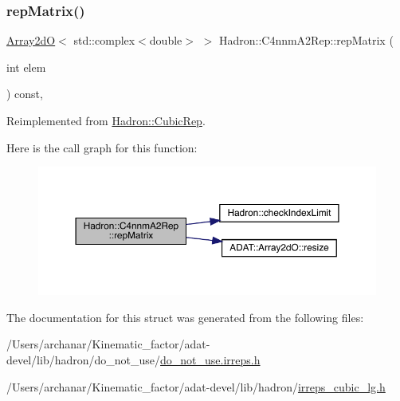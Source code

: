 \subsubsection{\texorpdfstring{repMatrix()}{repMatrix()}\hspace{0.1cm}{\footnotesize\ttfamily [3/3]}}
{\footnotesize\ttfamily \mbox{\hyperlink{classADAT_1_1Array2dO}{Array2dO}}$<$ std\+::complex$<$double$>$ $>$ Hadron\+::\+C4nnm\+A2\+Rep\+::rep\+Matrix (\begin{DoxyParamCaption}\item[{int}]{elem }\end{DoxyParamCaption}) const\hspace{0.3cm}{\ttfamily [inline]}, {\ttfamily [virtual]}}



Reimplemented from \mbox{\hyperlink{structHadron_1_1CubicRep_ac5d7e9e6f4ab1158b5fce3e4ad9e8005}{Hadron\+::\+Cubic\+Rep}}.

Here is the call graph for this function\+:
\nopagebreak
\begin{figure}[H]
\begin{center}
\leavevmode
\includegraphics[width=350pt]{d6/d9a/structHadron_1_1C4nnmA2Rep_a7c58333a62449bb9badf449950b1828b_cgraph}
\end{center}
\end{figure}


The documentation for this struct was generated from the following files\+:\begin{DoxyCompactItemize}
\item 
/\+Users/archanar/\+Kinematic\+\_\+factor/adat-\/devel/lib/hadron/do\+\_\+not\+\_\+use/\mbox{\hyperlink{adat-devel_2lib_2hadron_2do__not__use_2do__not__use_8irreps_8h}{do\+\_\+not\+\_\+use.\+irreps.\+h}}\item 
/\+Users/archanar/\+Kinematic\+\_\+factor/adat-\/devel/lib/hadron/\mbox{\hyperlink{adat-devel_2lib_2hadron_2irreps__cubic__lg_8h}{irreps\+\_\+cubic\+\_\+lg.\+h}}\end{DoxyCompactItemize}
